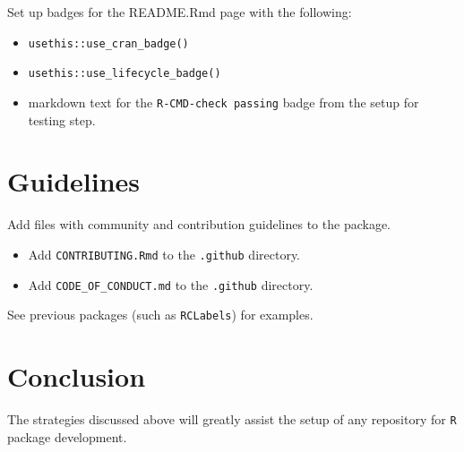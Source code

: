 \documentclass{article}
\begin{document}
Set up badges for the README.Rmd page with the following:

\begin{itemize}

  \item \verb|usethis::use_cran_badge()|

  \item \verb|usethis::use_lifecycle_badge()|

  \item markdown text for the \verb|R-CMD-check passing| badge from the setup for testing step.

\end{itemize}


\section{Guidelines}
\label{sec:guidelines}

Add files with community and contribution guidelines to the package.

\begin{itemize}

  \item Add \verb|CONTRIBUTING.Rmd| to the \verb|.github| directory.

  \item Add \verb|CODE_OF_CONDUCT.md| to the \verb|.github| directory.

\end{itemize}
%
See previous packages (such as \verb|RCLabels|) for examples.


\section{Conclusion}
\label{sec:conclusion}

The strategies discussed above will greatly assist the setup of any repository
for \texttt{R} package development.




% 
\end{document}
